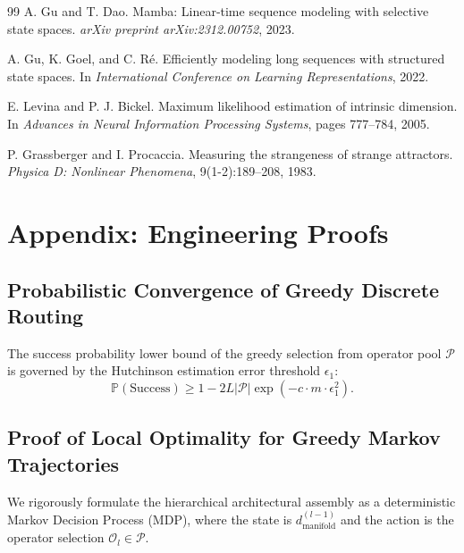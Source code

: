 \documentclass[11pt, a4paper]{article}
\theoremstyle{definition}
\begin{document}
\begin{thebibliography}{99}
A. Gu and T. Dao. 
\newblock Mamba: Linear‑time sequence modeling with selective state spaces.
\newblock \emph{arXiv preprint arXiv:2312.00752}, 2023.

A. Gu, K. Goel, and C. R\'e. 
\newblock Efficiently modeling long sequences with structured state spaces.
\newblock In \emph{International Conference on Learning Representations}, 2022.

E. Levina and P. J. Bickel.
\newblock Maximum likelihood estimation of intrinsic dimension.
\newblock In \emph{Advances in Neural Information Processing Systems}, pages 777--784, 2005.

P. Grassberger and I. Procaccia.
\newblock Measuring the strangeness of strange attractors.
\newblock \emph{Physica D: Nonlinear Phenomena}, 9(1-2):189--208, 1983.

\end{thebibliography}

\appendix
\section{Appendix: Engineering Proofs}
\label{app:proofs}

\subsection{Probabilistic Convergence of Greedy Discrete Routing}
\label{app:proof-path3}
The success probability lower bound of the greedy selection from operator pool $\mathcal{P}$ is governed by the Hutchinson estimation error threshold $\epsilon_1$:
\begin{equation}
    \mathbb{P}(\text{Success}) \ge 1 - 2L|\mathcal{P}|\exp\left(-c \cdot m \cdot \epsilon_1^2\right).
\end{equation}

\subsection{Proof of Local Optimality for Greedy Markov Trajectories}
\label{app:proof-markov-optimality}

We rigorously formulate the hierarchical architectural assembly as a deterministic Markov Decision Process (MDP), where the state is $d_{\text{manifold}}^{(l-1)}$ and the action is the operator selection $\mathcal{O}_l \in \mathcal{P}$.
\end{document}
